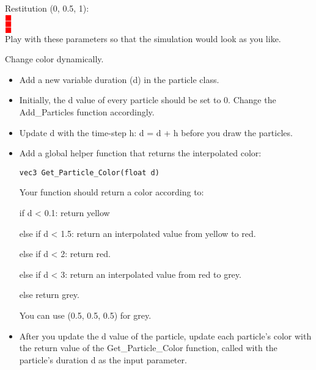 \documentclass[12pt]{article}
\newcommand{\TODO}{\textcolor{red}{$\blacksquare$}}
\begin{document}
Restitution (0, 0.5, 1):\\[0.5em]
\TODO  \\[0.5em]
\TODO  \\[0.5em]
\TODO  \\[0.5em]

Play with these parameters so that the simulation would look as you
like.

Change color dynamically.
\begin{itemize}
\item Add a new variable duration (d) in the particle class.

\item Initially, the d value of every particle should be set to 0. Change
the Add\_Particles function accordingly.

\item Update d with the time-step h: d = d + h before you draw the
particles.

\item Add a global helper function that returns the interpolated color:
\begin{lstlisting}
vec3 Get_Particle_Color(float d)
\end{lstlisting}

Your function should return a color according to:

if d \textless{} 0.1: return yellow

else if d \textless{} 1.5: return an interpolated value from yellow to red.

else if d \textless{} 2: return red.

else if d \textless{} 3: return an interpolated value from red to grey.

else return grey.

You can use (0.5, 0.5, 0.5) for grey.

\item After you update the d value of the particle, update each
particle's color with the return value of the Get\_Particle\_Color function,
called with the particle's duration d as the input parameter.
\end{itemize}
\end{document}
